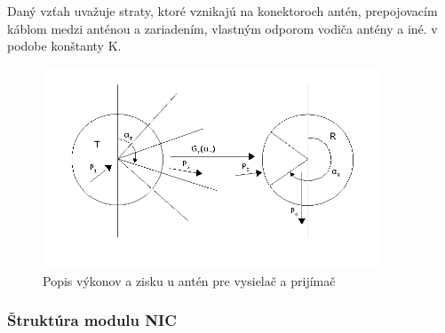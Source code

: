 \documentclass[11pt,twoside,a4paper]{book}
\begin{document}
Daný vzťah uvažuje straty, ktoré vznikajú na konektoroch antén, prepojovacím káblom medzi anténou a zariadením, vlastným odporom vodiča antény a iné. v podobe konštanty K.


\begin{figure}[htbp]
 \centering
 \includegraphics[width=10cm]{./figures/FSPL.png}
 \caption{Popis výkonov a zisku u antén pre vysielač a prijímač}
 \label{fig:FSPL}
\end{figure}


\subsubsection{Štruktúra modulu NIC}
\end{document}
